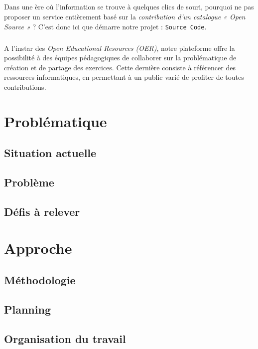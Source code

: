 \paragraph{} Dans une ère où l’information se trouve à quelques clics de souri, pourquoi ne pas proposer un service entièrement basé sur la \textit{contribution d’un catalogue « Open Source »} ? C’est donc ici que démarre notre projet : \texttt{Source Code}.

\paragraph{} A l’instar des \textit{Open Educational Resources (OER)}, notre plateforme offre la possibilité à des équipes pédagogiques de collaborer sur la problématique de création et de partage des exercices. Cette dernière consiste à référencer des ressources informatiques, en permettant à un public varié de profiter de toutes contributions. 



\chapter{Problématique}
\section{Situation actuelle}
\section{Problème}
\section{Défis à relever}

\chapter{Approche}
\section{Méthodologie}
\section{Planning}
\section{Organisation du travail}

